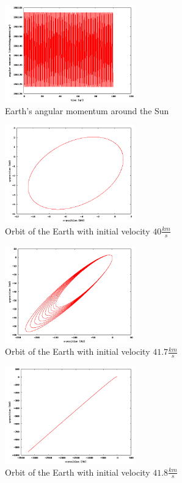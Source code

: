 \documentclass[a4wide,12pt]{article}
\begin{document}
\begin{figure}[p]
 \includegraphics[width=0.5\textwidth]{spin}
 \caption{Earth's angular momentum around the Sun}
 \label{fig:09} 
\end{figure}
\begin{figure}[p]
 \includegraphics[width=0.5\textwidth]{jordesc40}
 \caption{Orbit of the Earth with initial velocity $40 \frac{km}{s}$}
 \label{fig:10} 
\end{figure}
\begin{figure}[p]
 \includegraphics[width=0.5\textwidth]{jordesc417}
 \caption{Orbit of the Earth with initial velocity $41.7 \frac{km}{s}$}
 \label{fig:11} 
\end{figure}
\begin{figure}[p]
 \includegraphics[width=0.5\textwidth]{jordesc42}
 \caption{Orbit of the Earth with initial velocity $41.8 \frac{km}{s}$}
 \label{fig:12} 
\end{figure}
\end{document}
